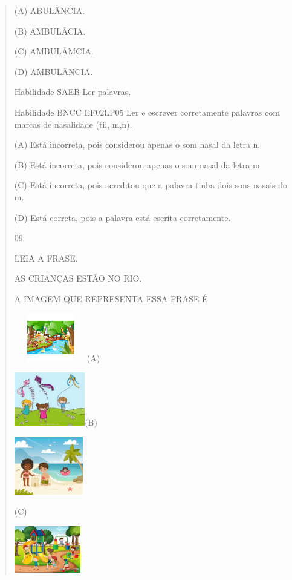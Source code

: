 {{{{\begin{verse}
{{\begin{escolha}
{{{{{(A) ABULÂNCIA.

(B) AMBULÂCIA.

(C) AMBULÂMCIA.

(D) AMBULÂNCIA.

\protect\hypertarget{_Hlk129375149}{}{}Habilidade SAEB Ler palavras.

Habilidade BNCC EF02LP05 Ler e escrever corretamente palavras com marcas
de nasalidade (til, m,n).

\protect\hypertarget{_Hlk129358521}{}{}(A) Está incorreta, pois
considerou apenas o som nasal da letra n.

(B) Está incorreta, pois considerou apenas o som nasal da letra m.

(C) Está incorreta, pois acreditou que a palavra tinha dois sons nasais
do m.

(D) Está correta, pois a palavra está escrita corretamente.

\num{09}

LEIA A FRASE.

AS CRIANÇAS ESTÃO NO RIO.

A IMAGEM QUE REPRESENTA ESSA FRASE É

\includegraphics[width=1.25000in,height=0.82361in]{media/image154.jpeg}(A)

\includegraphics[width=1.21181in,height=0.92014in]{media/image155.jpeg}(B)

\includegraphics[width=1.18125in,height=0.98472in]{media/image156.jpeg}

(C)

\includegraphics[width=1.13611in,height=0.80208in]{media/image157.jpeg}

}}}}}
\end{escolha}}}
\end{verse}}}}}
